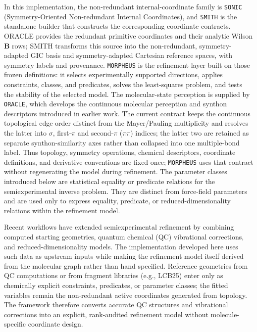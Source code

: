 \documentclass[aip,jcp,reprint,longbibliography,floatfix]{revtex4-2}
\begin{document}
In this implementation, the non-redundant internal-coordinate family is
\texttt{SONIC} (Symmetry-Oriented Non-redundant Internal Coordinates), and
\texttt{SMITH} is the standalone builder that constructs the corresponding
coordinate contracts. ORACLE provides the redundant primitive coordinates and
their analytic Wilson $\mathbf{B}$ rows; SMITH transforms this source into the
non-redundant, symmetry-adapted GIC basis and symmetry-adapted Cartesian
reference spaces, with symmetry labels and provenance. \texttt{MORPHEUS} is the refinement layer built on those
frozen definitions: it selects experimentally supported directions, applies
constraints, classes, and predicates, solves the least-squares problem, and
tests the stability of the selected model. The molecular-state perception is
supplied by \texttt{ORACLE}, which develops the continuous molecular perception
and synthon descriptors introduced in earlier work.\cite{Lazzari2020Proxima,Lazzari2024SynthonPCS}
The current contract keeps the continuous topological edge order distinct from
the Mayer/Pauling multiplicity and resolves the latter into $\sigma$,
first-$\pi$ and second-$\pi$ ($\pi\pi$) indices; the latter two are retained
as separate synthon-similarity axes rather than collapsed into one
multiple-bond label.
Thus topology, symmetry operations, chemical descriptors, coordinate
definitions, and derivative conventions are fixed once; \texttt{MORPHEUS} uses
that contract without regenerating the model during refinement.
The parameter classes introduced below are statistical equality or predicate
relations for the semiexperimental inverse problem. They are distinct from
force-field parameters and are used only to express equality, predicate, or
reduced-dimensionality relations within the refinement model.

Recent workflows have extended semiexperimental refinement by combining
computed starting geometries, quantum chemical (QC) vibrational corrections, and
reduced-dimensionality models.\cite{Mendolicchio2025FastDvib} The implementation
developed here uses such data as upstream inputs while making the refinement
model itself derived from the molecular graph rather than hand specified.
Reference geometries from QC computations or from fragment libraries (e.g.,
LCB25\cite{Lazzari2025LCB25}) enter only as chemically explicit constraints,
predicates, or parameter classes; the fitted variables remain the
non-redundant active coordinates generated from topology. The framework
therefore converts accurate QC structures and vibrational corrections into an
explicit, rank-audited refinement model without molecule-specific coordinate
design.
\end{document}
